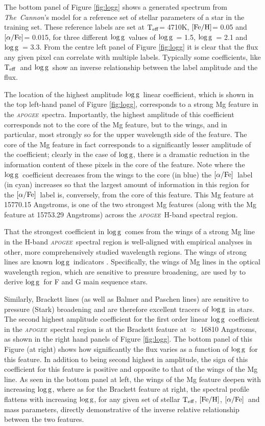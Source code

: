 \documentclass[12pt, preprint]{aastex}
\newcommand{\project}[1]{\textsl{#1}}
\newcommand{\tc}{\project{The~Cannon}}
\newcommand{\apogee}{\project{\textsc{apogee}}}
\newcommand{\teff}{\mbox{$\rm T_{eff}$}}
\newcommand{\feh}{\mbox{$\rm [Fe/H]$}}
\newcommand{\alphafe}{\mbox{$\rm [\alpha/Fe]$}}
\newcommand{\logg}{\mbox{$\rm \log g$}}
\begin{document}
The bottom panel of Figure  \ref{fig:logg} shows a generated spectrum from \tc's model for a reference set of stellar parameters of a star in the training set. These reference labels are set at \teff = 4710K, \feh = 0.05 and \alphafe = 0.015, for three different \logg\ values of \logg\ = 1.5, \logg\ = 2.1 and \logg\ = 3.3. From the centre left panel of Figure \ref{fig:logg} it is clear that the flux any given pixel can correlate with multiple labels. Typically some coefficients, like \teff\ and \logg\ show an inverse relationship between the label amplitude and the flux.

The location of the highest amplitude \logg\ linear coefficient, which is shown in the top left-hand panel of Figure \ref{fig:logg}, corresponds to a strong  Mg feature in the \apogee\ spectra. Importantly, the highest amplitude of this coefficient corresponds not to the core of the Mg feature, but to the wings, and in particular, most strongly so for the upper wavelength side of the feature. The core of the Mg feature in fact  corresponds to a significantly lesser amplitude of  the coefficient; clearly in the case of \logg,  there is a dramatic reduction in the information content of these pixels in the core of the feature. Note where the \logg\ coefficient decreases from the wings to the core (in blue) the \alphafe\ label (in cyan) increases so that the largest amount of information in this region for the \alphafe\ label is, conversely, from the core of this feature. This Mg feature at 15770.15 Angstroms, is one of the two strongest Mg features (along with the Mg feature at 15753.29 Angstroms) across the \apogee\ H-band spectral region. 

That the strongest coefficient in \logg\ comes from the wings of a strong Mg line in the H-band \apogee\ spectral region is well-aligned with empirical analyses in other, more comprehensively studied wavelength regions. The wings of strong lines are known \logg\ indicators \citep{Gray2008}. Specifically, the wings of Mg lines in the optical wavelength region, which are sensitive to pressure broadening, are used by \citet{F1997} to derive \logg\ for F and G main sequence stars.  

Similarly, Brackett lines (as well as Balmer and Paschen lines)  are sensitive to pressure (Stark) broadening and are therefore excellent tracers of \logg\ in stars. The second highest amplitude coefficient for the first order linear \logg\ coefficient in the \apogee\ spectral region is at the Brackett feature  at $\approx$ 16810 Angstroms, as shown in the right hand panels of Figure \ref{fig:logg}. The  bottom panel of this Figure (at right) shows how significantly the flux varies as a function of \logg\ for this feature. In addition to being second highest in amplitude, the sign of this coefficient for this feature is positive and opposite to that  of the wings of the Mg line. As seen in the bottom panel at left, the wings of the Mg feature deepen with increasing \logg, where as for the Brackett feature at right, the spectral profile flattens with increasing \logg, for any given set of stellar \teff, \feh, \alphafe\ and mass parameters, directly demonstrative of the inverse relative relationship between the two features. 
\end{document}

